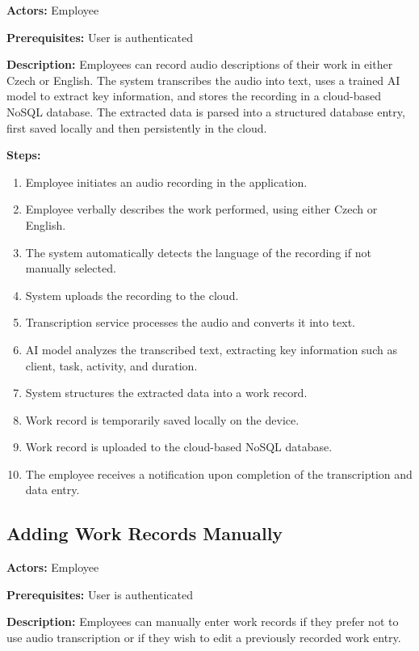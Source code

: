 \documentclass[
  digital,     %
  oneside,     %
  nosansbold,  %
  nocolorbold, %
  lof,         %
  lot,         %
]{fithesis4}
\begin{document}
\noindent \textbf{Actors:} Employee

\noindent \textbf{Prerequisites:} User is authenticated

\noindent \textbf{Description:}  
Employees can record audio descriptions of their work in either Czech or English. The system transcribes the audio into text, uses a trained AI model to extract key information, and stores the recording in a cloud-based NoSQL database. The extracted data is parsed into a structured database entry, first saved locally and then persistently in the cloud.

\noindent \textbf{Steps:}
\begin{enumerate}
    \item Employee initiates an audio recording in the application.
    \item Employee verbally describes the work performed, using either Czech or English.
    \item The system automatically detects the language of the recording if not manually selected.
    \item System uploads the recording to the cloud.
    \item Transcription service processes the audio and converts it into text.
    \item AI model analyzes the transcribed text, extracting key information such as client, task, activity, and duration.
    \item System structures the extracted data into a work record.
    \item Work record is temporarily saved locally on the device.
    \item Work record is uploaded to the cloud-based NoSQL database.
    \item The employee receives a notification upon completion of the transcription and data entry.
\end{enumerate}

\subsection{Adding Work Records Manually}

\noindent \textbf{Actors:} Employee

\noindent \textbf{Prerequisites:} User is authenticated

\noindent \textbf{Description:}  
Employees can manually enter work records if they prefer not to use audio transcription or if they wish to edit a previously recorded work entry.
\end{document}
